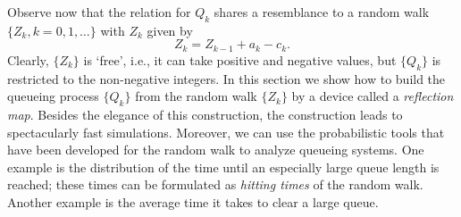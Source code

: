 Observe now that the relation for $Q_k$
shares a resemblance to a random walk $\{Z_k, k=0,1,\ldots\}$ with  $Z_k$ 
given by
\begin{equation*}
  Z_k = Z_{k-1} + a_k - c_k.
\end{equation*}
Clearly, $\{Z_k\}$ is `free', i.e., it can take positive and negative
values, but $\{Q_k\}$ is restricted to the non-negative integers.  In
this section we show how to build the queueing process $\{Q_k\}$ from
the random walk $\{Z_k\}$ by a device called a \emph{reflection map}.
Besides the elegance of this construction, the construction leads to
spectacularly fast simulations. Moreover, we can use the probabilistic
tools that have been developed for the random walk to analyze queueing
systems. One example is the distribution of the time until an
especially large queue length is reached; these times can be
formulated as \emph{hitting times} of the random walk. Another example
is the average time it takes to clear a large queue.

